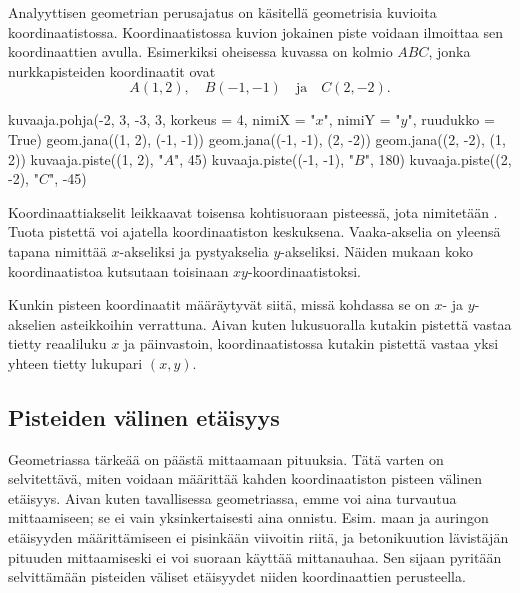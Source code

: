 
Analyyttisen geometrian perusajatus on käsitellä geometrisia kuvioita koordinaatistossa.
Koordinaatistossa kuvion jokainen piste voidaan ilmoittaa sen koordinaattien avulla.
Esimerkiksi oheisessa kuvassa on kolmio $ABC$, jonka nurkkapisteiden koordinaatit ovat
\[
A(1, 2), \quad B(-1, -1) \quad \text{ja} \quad C(2, -2).
\]

\begin{kuva}
    kuvaaja.pohja(-2, 3, -3, 3, korkeus = 4, nimiX = "$x$", nimiY = "$y$", ruudukko = True)
    geom.jana((1, 2), (-1, -1))
    geom.jana((-1, -1), (2, -2))
    geom.jana((2, -2), (1, 2))
    kuvaaja.piste((1, 2), "$A$", 45)
    kuvaaja.piste((-1, -1), "$B$", 180)
    kuvaaja.piste((2, -2), "$C$", -45)
\end{kuva}

Koordinaattiakselit leikkaavat toisensa kohtisuoraan pisteessä, jota nimitetään .
Tuota pistettä voi ajatella koordinaatiston keskuksena.
Vaaka-akselia on yleensä tapana nimittää $x$-akseliksi ja pystyakselia $y$-akseliksi.
Näiden mukaan koko koordinaatistoa kutsutaan toisinaan $xy$-koordinaatistoksi.

Kunkin pisteen koordinaatit määräytyvät siitä, missä kohdassa se on $x$- ja $y$-akselien asteikkoihin verrattuna.
Aivan kuten lukusuoralla kutakin pistettä vastaa tietty reaaliluku $x$ ja päinvastoin, koordinaatistossa kutakin pistettä vastaa yksi yhteen tietty lukupari $(x, y)$.

\subsection*{Pisteiden välinen etäisyys}

Geometriassa tärkeää on päästä mittaamaan pituuksia.
Tätä varten on selvitettävä, miten voidaan määrittää kahden koordinaatiston pisteen välinen etäisyys.
Aivan kuten tavallisessa geometriassa, emme voi aina turvautua mittaamiseen; se ei vain yksinkertaisesti aina onnistu. Esim. maan ja auringon etäisyyden määrittämiseen ei pisinkään viivoitin riitä, ja betonikuution lävistäjän pituuden mittaamiseski ei voi suoraan käyttää mittanauhaa. Sen sijaan pyritään selvittämään pisteiden väliset etäisyydet niiden koordinaattien perusteella.

